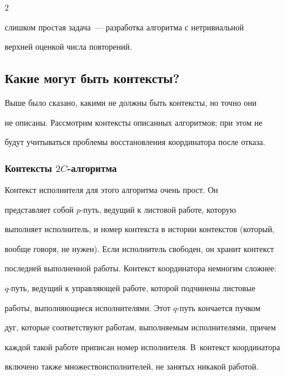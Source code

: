 \begin{multicols}{2}
\begin{enumerate}[1.]
слишком простая задача~--- разработка алгоритма с нетривиальной 


верхней оценкой числа повторений.


\end{enumerate}





\subsection{Какие могут быть контексты?}


      


      Выше было сказано, какими не должны быть контексты, но точно они 


не описаны. Рас\-смот\-рим контексты описанных алгоритмов; при этом не 


будут учитываться проблемы восстановления координатора после отказа. 





\subsubsection{Контексты $2C$-алгоритма} 


      


      Контекст исполнителя для этого алгоритма очень прост. Он 


представляет собой $p$-путь, ведущий к листовой работе, которую 


выполняет исполнитель, и номер контекста в истории контекстов (который, 


вообще говоря, не нужен). Если исполнитель свободен, он хранит контекст 


последней выполненной работы. Контекст координатора немногим сложнее: 


$q$-путь, ведущий к управ\-ля\-ющей работе, которой подчинены листовые 


работы, выполняющиеся исполнителями. Этот $q$-путь кончается пучком 


дуг, которые соответствуют работам, выполняемым исполнителями, причем 


каж\-дой такой работе приписан номер исполнителя. В~контекст координатора 


включено также мно\-жество\linebreak исполнителей, не занятых никакой работой. 



\end{multicols}

